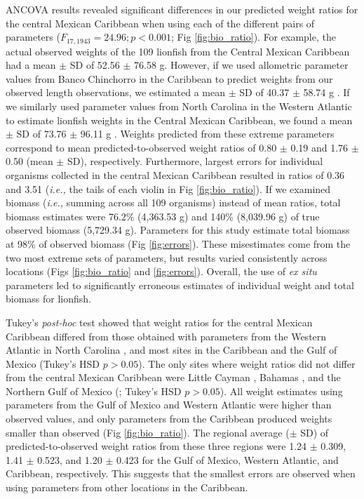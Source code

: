\documentclass[fleqn,10pt,lineno]{wlpeerj} %
\begin{document}
ANCOVA results revealed significant differences in our predicted weight
ratios for the central Mexican Caribbean when using each of the
different pairs of parameters (\(F_{17, 1943} = 24.96; p < 0.001\); Fig
\ref{fig:bio_ratio}). For example, the actual observed weights of the
109 lionfish from the Central Mexican Caribbean had a mean \(\pm\) SD of
52.56 \(\pm\) 76.58 g. However, if we used allometric parameter values
from Banco Chinchorro in the Caribbean to predict weights from our
observed length observations, we estimated a mean \(\pm\) SD of 40.37
\(\pm\) 58.74 g \citep{sabidoitz_2016}. If we similarly used parameter
values from North Carolina in the Western Atlantic to estimate lionfish
weights in the Central Mexican Caribbean, we found a mean \(\pm\) SD of
73.76 \(\pm\) 96.11 g \citep{barbour_2011}. Weights predicted from these
extreme parameters correspond to mean predicted-to-observed weight
ratios of 0.80 \(\pm\) 0.19 and 1.76 \(\pm\) 0.50 (mean \(\pm\) SD),
respectively. Furthermore, largest errors for individual organisms
collected in the central Mexican Caribbean resulted in ratios of 0.36
and 3.51 (\emph{i.e.,} the tails of each violin in Fig
\ref{fig:bio_ratio}). If we examined biomass (\emph{i.e.,} summing
across all 109 organisms) instead of mean ratios, total biomass
estimates were 76.2\% (4,363.53 g) and 140\% (8,039.96 g) of true
observed biomass (5,729.34 g). Parameters for this study estimate total
biomass at 98\% of observed biomass (Fig \ref{fig:errors}). These misestimates come from the
two most extreme sets of parameters, but results varied consistently
across locations (Figs \ref{fig:bio_ratio} and \ref{fig:errors}).
Overall, the use of \emph{ex situ} parameters led to significantly
erroneous estimates of individual weight and total biomass for lionfish.

Tukey's \emph{post-hoc} test showed that weight ratios for the central
Mexican Caribbean differed from those obtained with parameters from the
Western Atlantic in North Carolina \citep{barbour_2011},
and most sites in the Caribbean and the Gulf of Mexico
(Tukey's HSD \(p > 0.05\)). The only sites where weight ratios did not
differ from the central Mexican Caribbean were Little Cayman
\citep{edwards_2014}, Bahamas \citep{darling_2011},
and the Northern Gulf of Mexico (\citet{dahl_2014}; Tukey's HSD
\(p > 0.05\)). All weight estimates using parameters from the Gulf of
Mexico and Western Atlantic were higher than observed values, and only
parameters from the Caribbean produced weights smaller than observed
(Fig \ref{fig:bio_ratio}). The regional average (\(\pm\) SD) of
predicted-to-observed weight ratios from these three regions were 1.24
\(\pm\) 0.309, 1.41 \(\pm\) 0.523, and 1.20 \(\pm\) 0.423 for the Gulf
of Mexico, Western Atlantic, and Caribbean, respectively. This suggests
that the smallest errors are observed when using parameters from other
locations in the Caribbean.
\end{document}
